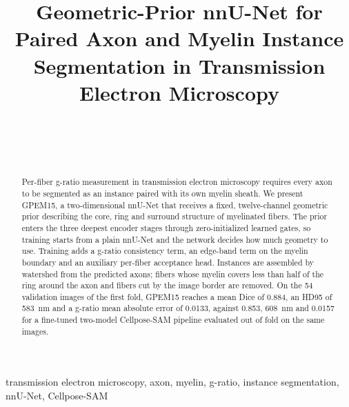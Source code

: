 \documentclass[journal]{IEEEtran}
\begin{document}
\title{Geometric-Prior nnU-Net for Paired Axon and Myelin Instance Segmentation in Transmission Electron Microscopy}

\author{%
    \\
    \\
    \\
}

\maketitle

\begin{abstract}
Per-fiber g-ratio measurement in transmission electron microscopy requires
every axon to be segmented as an instance paired with its own myelin sheath.
We present GPEM15, a two-dimensional nnU-Net that receives a fixed,
twelve-channel geometric prior describing the core, ring and surround
structure of myelinated fibers. The prior enters the three deepest encoder
stages through zero-initialized learned gates, so training starts from a plain
nnU-Net and the network decides how much geometry to use. Training adds a
g-ratio consistency term, an edge-band term on the myelin boundary and an
auxiliary per-fiber acceptance head. Instances are assembled by watershed from
the predicted axons; fibers whose myelin covers less than half of the ring
around the axon and fibers cut by the image border are removed. On the 54
validation images of the first fold, GPEM15 reaches a mean
Dice of 0.884, an HD95 of 583~nm and a g-ratio mean absolute error of
0.0133, against 0.853, 608~nm and 0.0157 for a fine-tuned two-model
Cellpose-SAM pipeline evaluated out of fold on the same images.
\end{abstract}

\begin{IEEEkeywords}
transmission electron microscopy, axon, myelin, g-ratio, instance segmentation, nnU-Net, Cellpose-SAM
\end{IEEEkeywords}

\end{document}
